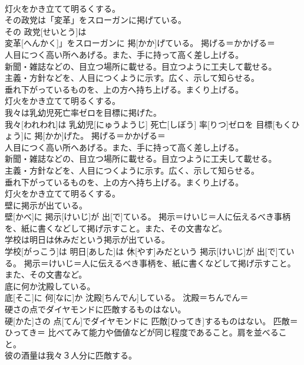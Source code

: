 \documentclass[8pt]{extreport}
\begin{document}
\begin{CJK}{UTF8}{min}
{\\	灯火をかき立てて明るくする。
\\	その政党は「変革」をスローガンに掲げている。	
\\	その 政党[せいとう]は
\\	変革[へんかく]」をスローガンに 掲[かか]げている。	掲げる＝かかげる＝ 
\\	人目につく高い所へあげる。また、手に持って高く差し上げる。 
\\	新聞・雑誌などの、目立つ場所に載せる。目立つように工夫して載せる。 
\\	主義・方針などを、人目につくように示す。広く、示して知らせる。 
\\	垂れ下がっているものを、上の方へ持ち上げる。まくり上げる。 
\\	灯火をかき立てて明るくする。
\\	我々は乳幼児死亡率ゼロを目標に掲げた。	
\\	我々[われわれ]は 乳幼児[にゅうようじ] 死亡[しぼう] 率[りつ]ゼロを 目標[もくひょう]に 掲[かか]げた。	掲げる＝かかげる＝ 
\\	人目につく高い所へあげる。また、手に持って高く差し上げる。 
\\	新聞・雑誌などの、目立つ場所に載せる。目立つように工夫して載せる。 
\\	主義・方針などを、人目につくように示す。広く、示して知らせる。 
\\	垂れ下がっているものを、上の方へ持ち上げる。まくり上げる。 
\\	灯火をかき立てて明るくする。
\\	壁に掲示が出ている。	
\\	壁[かべ]に 掲示[けいじ]が 出[で]ている。	掲示＝けいじ＝人に伝えるべき事柄を、紙に書くなどして掲げ示すこと。また、その文書など。
\\	学校は明日は休みだという掲示が出ている。	
\\	学校[がっこう]は 明日[あした]は 休[やす]みだという 掲示[けいじ]が 出[で]ている。	掲示＝けいじ＝人に伝えるべき事柄を、紙に書くなどして掲げ示すこと。また、その文書など。
\\	底に何か沈殿している。	
\\	底[そこ]に 何[なに]か 沈殿[ちんでん]している。	沈殿＝ちんでん＝ 
\\	硬さの点でダイヤモンドに匹敵するものはない。	
\\	硬[かた]さの 点[てん]でダイヤモンドに 匹敵[ひってき]するものはない。	匹敵＝ひってき＝ 比べてみて能力や価値などが同じ程度であること。肩を並べること。
\\	彼の酒量は我々３人分に匹敵する。	
}
\end{CJK}
\end{document}

